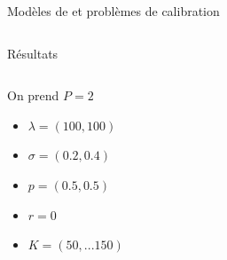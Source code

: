 \documentclass[final]{beamer}
\newlength{\onecolwid}
\newlength{\twocolwid}
\begin{document}
\begin{frame}[t]
\begin{columns}[t]
\begin{column}{\twocolwid}
\begin{block}{Modèles de  et problèmes de calibration}
\begin{columns}[t,totalwidth=\twocolwid]
\end{columns} %

\end{block}


\vspace{0cm}
\begin{block}{Résultats}


\begin{columns}[t,totalwidth=0.45\paperwidth] %

\begin{column}{\onecolwid} %


\begin{minipage}{0.49\textwidth}
  \vspace{2cm}
  On prend $P = 2$
  \begin{itemize}
    \item $\lambda = (100,100)$
    \item $\sigma = (0.2, 0.4)$
    \item $p = (0.5,0.5) $
    \item $r = 0$
    \item $K = (50,...150)$
  \end{itemize}
\end{minipage}


\end{column}
\end{columns}
\end{block}
\end{column}
\end{columns}
\end{frame}
\end{document}
